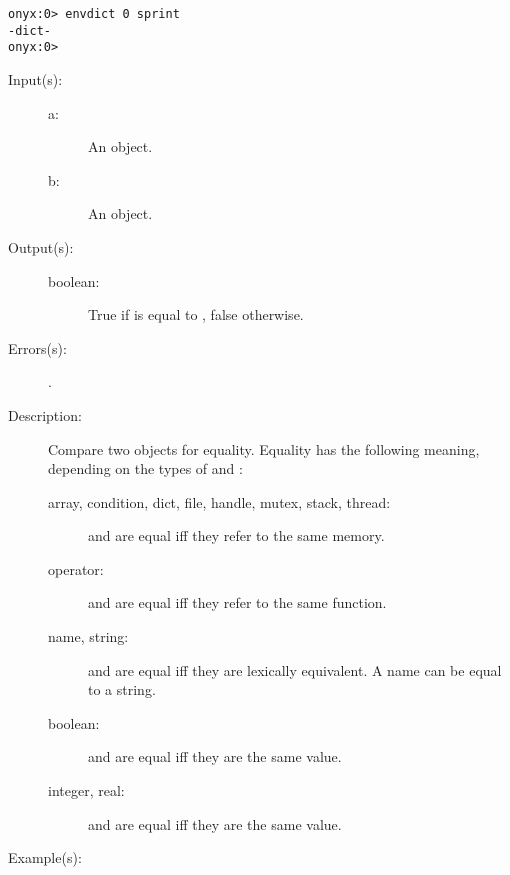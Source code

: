 \begin{description}
\begin{description}
\begin{verbatim}
onyx:0> envdict 0 sprint
-dict-
onyx:0>
		\end{verbatim}
	\end{description}
\label{systemdict:eq}
\item[{\onyxop{a b}{eq}{boolean}}: ]
	\begin{description}\item[]
	\item[Input(s): ]
		\begin{description}\item[]
		\item[a: ]
			An object.
		\item[b: ]
			An object.
		\end{description}
	\item[Output(s): ]
		\begin{description}\item[]
		\item[boolean: ]
			True if  is equal to , false
			otherwise.
		\end{description}
	\item[Errors(s): ]
		\begin{description}\item[]
		\item[.]
		\end{description}
	\item[Description: ]
		Compare two objects for equality.  Equality has the following
		meaning, depending on the types of  and :
		\begin{description}
		\item[array, condition, dict, file, handle, mutex, stack,
		thread: ]  and  are equal iff they refer to
		the same memory.
		\item[operator: ]  and  are equal iff they
		refer to the same function.
		\item[name, string: ]  and  are equal iff they
		are lexically equivalent.  A name can be equal to a string.
		\item[boolean: ]  and  are equal iff they
		are the same value.
		\item[integer, real: ]  and  are equal iff
		they are the same value.
		\end{description}
	\item[Example(s): ]\begin{verbatim}


\end{verbatim}
\end{description}
\end{description}
